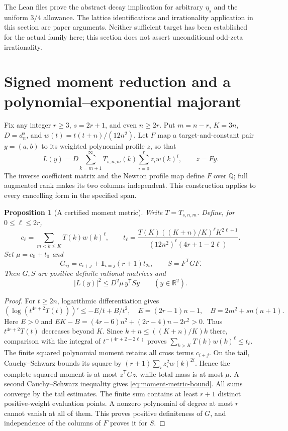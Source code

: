 \documentclass[11pt]{article}
\newtheorem{proposition}[theorem]{Proposition}
\theoremstyle{remark}
\newcommand{\R}{\mathbb R}
\newcommand{\Q}{\mathbb Q}
\begin{document}
The Lean files prove the abstract decay implication for arbitrary
\(\eta_s\) and the uniform \(3/4\) allowance. The lattice
identifications and irrationality application in this section are paper
arguments. Neither sufficient target has been established for the actual
family here; this section does not assert unconditional odd-zeta
irrationality.

\section{Signed moment reduction and a polynomial--exponential majorant}
Fix any integer \(r\ge3\), \(s=2r+1\), and even \(n\ge2r\).
Put \(m=n-r\), \(K=3n\), \(D=d_n^s\), and
\(w(t)=t(t+n)/(12n^2)\). Let \(F\) map a target-and-constant
pair \(y=(a,b)\) to its weighted polynomial profile \(z\), so that
\[
 L(y)=D\sum_{k=m+1}^{\infty}T_{s,n,m}(k)
                  \sum_{i=0}^r z_i w(k)^i,\qquad z=Fy.
\]
The inverse coefficient matrix and the Newton profile map define \(F\)
over \(\Q\); full augmented rank makes its two columns independent.
This construction applies to every cancelling form in the specified span.

\begin{proposition}[A certified moment metric]
Write \(T=T_{s,n,m}\). Define, for \(0\le\ell\le2r\),
\[
 c_\ell=\sum_{m<k\le K}T(k)w(k)^\ell,\qquad
 t_\ell=\frac{T(K)((K+n)/K)^\ell K^{2\ell+1}}
 {(12n^2)^\ell(4r+1-2\ell)}.
\]
Set \(\mu=c_0+t_0\) and
\[
 G_{ij}=c_{i+j}+\mathbf1_{i=j}(r+1)t_{2i},\qquad S=F^{\mathsf T}GF.
\]
Then \(G,S\) are positive definite rational matrices and
\begin{equation}
 |L(y)|^2\le D^2\mu\,y^{\mathsf T}Sy\qquad(y\in\R^2).
 \label{eq:moment-metric-bound}
\end{equation}
\end{proposition}
\begin{proof}
For \(t\ge2n\), logarithmic differentiation gives
\[
 (\log(t^{4r+2}T(t)))'\le-E/t+B/t^2,
 \quad E=(2r-1)n-1,\quad B=2m^2+sn(n+1).
\]
Here \(E>0\) and
\(EK-B=(4r-6)n^2+(2r-4)n-2r^2>0\).
Thus \(t^{4r+2}T(t)\) decreases beyond \(K\). Since
\(k+n\le ((K+n)/K)k\) there, comparison with the integral
of \(t^{-(4r+2-2\ell)}\) proves
\(\sum_{k>K}T(k)w(k)^\ell\le t_\ell\).
The finite squared polynomial moment retains all cross terms
\(c_{i+j}\). On the tail, Cauchy--Schwarz bounds its square by
\((r+1)\sum_i z_i^2w(k)^{2i}\). Hence the complete squared
moment is at most \(z^{\mathsf T}Gz\), while total mass is at most
\(\mu\). A second Cauchy--Schwarz inequality gives
\eqref{eq:moment-metric-bound}. All sums converge by the tail estimates.
The finite sum contains at least \(r+1\) distinct positive-weight
evaluation points. A nonzero polynomial of degree at most \(r\)
cannot vanish at all of them. This proves positive definiteness of
\(G\), and independence of the columns of \(F\) proves it for \(S\).
\end{proof}
\end{document}
